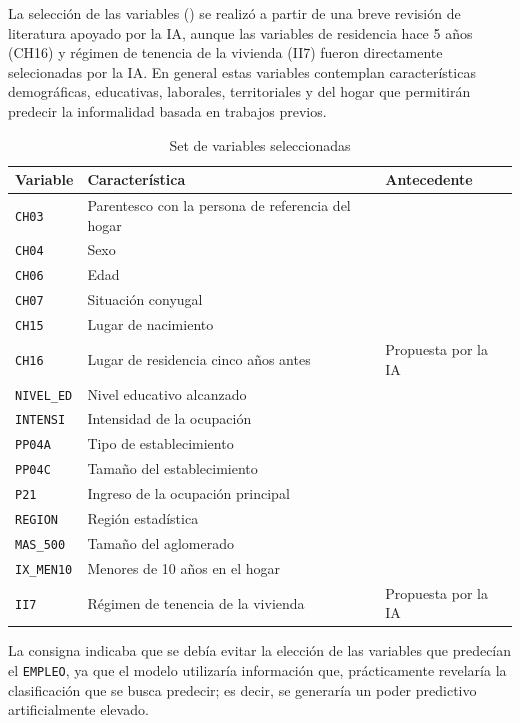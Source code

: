 La selección de las variables () se realizó a partir de una breve revisión de literatura apoyado por la IA, aunque las variables de residencia hace 5 años (CH16) y régimen de tenencia de la vivienda (II7) fueron directamente selecionadas por la IA. En general estas variables contemplan características demográficas, educativas, laborales, territoriales y del hogar que permitirán predecir la informalidad basada en trabajos previos.
\begin{table}[H]
	\centering
	\caption{Set de variables seleccionadas}
	\label{tab:variables_parte01}
	\footnotesize
	\begin{tabular}{p{1.8cm}p{5cm}p{7cm}}
		\hline
		\textbf{Variable} & \textbf{Característica} & \textbf{Antecedente} \\
		\hline
		\texttt{CH03} & Parentesco con la persona de referencia del hogar & \citet{casal2013} \\
		\texttt{CH04} & Sexo & \multirow{2}{7cm}{\citet{formichella2008,ludmer2020}} \\
		\texttt{CH06} & Edad & \\
		\texttt{CH07} & Situación conyugal & \citet{casal2013} \\
		\texttt{CH15} & Lugar de nacimiento & \citet{ludmer2020} \\
		\texttt{CH16} & Lugar de residencia cinco años antes & Propuesta por la IA \\
		\texttt{NIVEL\_ED} & Nivel educativo alcanzado & \citet{formichella2008,alvarez2025} \\
		\texttt{INTENSI} & Intensidad de la ocupación & \citet{alvarez2025} \\
		\texttt{PP04A} & Tipo de establecimiento & \citet{bertranou2013} \\
		\texttt{PP04C} & Tamaño del establecimiento & \citet{cruces2018,ludmer2020} \\
		\texttt{P21} & Ingreso de la ocupación principal & \citet{alvarez2025} \\
		\texttt{REGION} & Región estadística & \multirow{2}{7cm}{\citet{cristina2019}} \\
		\texttt{MAS\_500} & Tamaño del aglomerado & \\
		\texttt{IX\_MEN10} & Menores de 10 años en el hogar & \citet{casal2013} \\
		\texttt{II7} & Régimen de tenencia de la vivienda & Propuesta por la IA \\
		\hline
	\end{tabular}
\end{table}
\vspace{-0.5cm}
La consigna indicaba que se debía evitar la elección de las variables que predecían el \texttt{EMPLEO}, ya que el modelo utilizaría información que, prácticamente revelaría la clasificación que se busca predecir; es decir, se generaría un poder predictivo artificialmente elevado.

